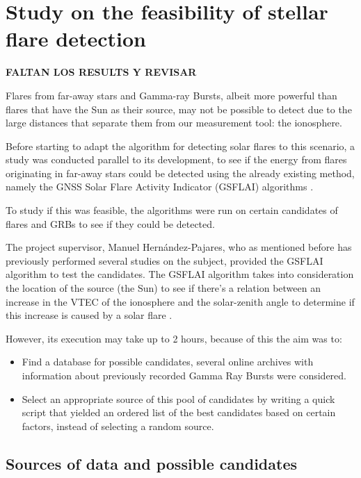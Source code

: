 \chapter{Study on the feasibility of stellar flare detection}

\textbf{FALTAN LOS RESULTS Y REVISAR}

Flares from far-away stars and Gamma-ray Bursts, albeit more powerful than flares that have the Sun as their source, may not be possible to detect due to the large distances that separate them from our measurement tool: the ionosphere.

Before starting to adapt the algorithm for detecting solar flares to this scenario, a study was conducted parallel to its development, to see if the energy from flares originating in far-away stars could be detected using the already existing method, namely the GNSS Solar Flare Activity Indicator (GSFLAI) algorithms \cite{hernandez2012gnss}.

To study if this was feasible, the algorithms were run on certain candidates of flares and GRBs to see if they could be detected.

The project supervisor, Manuel Hernández-Pajares, who as mentioned before has previously performed several studies on the subject, provided the GSFLAI algorithm to test the candidates. The GSFLAI algorithm takes into consideration the location of the source (the Sun) to see if there's a relation between an increase in the VTEC of the ionosphere and the solar-zenith angle to determine if this increase is caused by a solar flare \cite{hernandez2012gnss}.

However, its execution may take up to 2 hours, because of this the aim was to:

\begin{itemize}
	\item Find a database for possible candidates, several online archives with information about previously recorded Gamma Ray Bursts were considered.
	\item Select an appropriate source of this pool of candidates by writing a quick script that yielded an ordered list of the best candidates based on certain factors, instead of selecting a random source.
\end{itemize}

\section{Sources of data and possible candidates}

